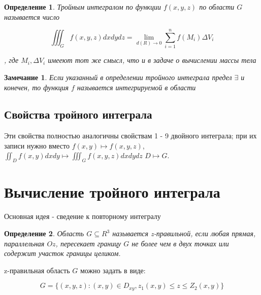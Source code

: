 \documentclass[a4paper, 14pt]{report}
\newtheorem{defenition}{Определение}[chapter]
\newtheorem{note}{Замечание}[chapter]
\begin{document}
    \begin{defenition}
        Тройным интегралом по функции $f(x,y,z)$ по области $G$ называется число 

        $$
        \iiint_G f(x,y,z) dxdydz = \lim_{d(R) \to 0} \sum_{i=1}^n f(M_i) \Delta V_i
        $$

        , где $M_i, \Delta V_i$ имееют тот же смысл, что и в задаче о вычислении массы тела
    \end{defenition}

    \begin{note}
        Если указанный в определении тройного интеграла предел $\exists$ и конечен, то функция $f$ называется интегрируемой в области 
    \end{note}

    \subsection{Свойства тройного интеграла}

    Эти свойства полностью аналогичны свойствам 1 - 9 двойного интеграла; при их записи нужно вместо $f(x,y) \mapsto f(x,y,z)$, $\iint_D f(x,y) dxdy \mapsto \iiint_G f(x,y,z) dxdydz$ $D \mapsto G$.

    \section{Вычисление тройного интеграла}

    Основная идея - сведение к повторному интегралу

    \begin{defenition}
        Область $G \subseteq R^3$ называется z-правильной, если любая прямая, параллельная $Oz$, пересекает границу $G$ не более чем в двух точках или содержит участок границы целиком.
    \end{defenition}

    z-правильная область $G$ можно задать в виде:

    $$
    G = \{ (x,y,z) : (x,y) \in D_{xy}, z_1(x,y) \le z \le Z_2(x,y) \}
    $$
\end{document}
